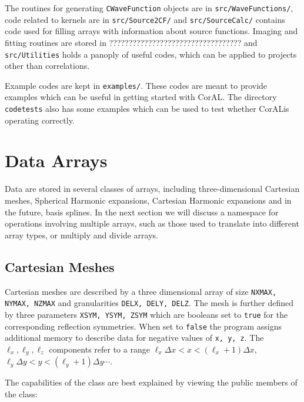 \documentclass[10pt]{article}
\newcommand{\coral}{CorAL}
\begin{document}
The routines for generating {\tt CWaveFunction} objects are in {\tt src/WaveFunctions/}, code related to kernels are in {\tt src/Source2CF/} and {\tt src/SourceCalc/} contains code used for filling arrays with information about source functions. Imaging and fitting routines are stored in ??????????????????????????????????  and {\tt src/Utilities} holds a panoply of useful codes, which can be applied to projects other than correlations.

Example codes are kept in {\tt examples/}. These codes are meant to provide examples which can be useful in getting started with \coral. The directory {\tt codetests} also has some examples which can be used to test whether \coral is operating correctly.

\section{Data Arrays}
\label{sec:arrays}

Data are stored in several classes of arrays, including three-dimensional Cartesian meshes, Spherical Harmonic expansions, Cartesian Harmonic expansions and in the future, basis splines. In the next section we will discuss a namespace for operations involving multiple arrays, such as those used to translate into different array types, or multiply and divide arrays.

\subsection{Cartesian Meshes}

Cartesian meshes are described by a three dimensional array of size {\tt NXMAX, NYMAX, NZMAX} and granularities {\tt DELX, DELY, DELZ}. The mesh is further defined by three parameters {\tt XSYM, YSYM, ZSYM} which are booleans set to {\tt true} for the corresponding reflection symmetries. When set to {\tt false} the program assigns additional memory to describe data for negative values of {\tt x, y, z}. The $\ell_x,\ell_y,\ell_z$ components refer to a range $\ell_x\Delta x<x<(\ell_x+1)\Delta x$, $\ell_y\Delta y<y<(\ell_y+1)\Delta y\cdots$.

The capabilities of the class are best explained by viewing the public members of the class:\\
\end{document}
